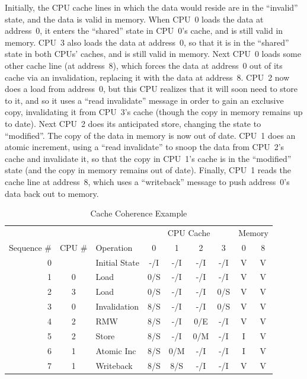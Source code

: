 Initially, the CPU cache lines in which the data would reside are
in the ``invalid'' state, and the data is valid in memory.
When CPU~0 loads the data at address~0, it enters the ``shared'' state in
CPU~0's cache, and is still valid in memory.
CPU~3 also loads the data at address~0, so that it is in the
``shared'' state in both CPUs' caches, and is still valid in memory.
Next CPU~0 loads some other cache line (at address~8),
which forces the data at address~0 out of its cache via an invalidation,
replacing it with the data at address~8.
CPU~2 now does a load from address~0, but this CPU realizes that it will
soon need to store to it, and so it uses a ``read invalidate'' message
in order to gain an exclusive copy, invalidating
it from CPU~3's cache (though the copy in memory remains up to date).
Next CPU~2 does its anticipated store, changing the state to ``modified''.
The copy of the data in memory is now out of date.
CPU~1 does an atomic increment, using a ``read invalidate'' to snoop
the data from CPU~2's cache
and invalidate it, so that the copy in CPU~1's cache is in the ``modified''
state (and the copy in memory remains out of date).
Finally, CPU~1 reads the cache line at address~8, which uses a
``writeback'' message to push address~0's data back out to memory.
\fi

\begin{table}
\small
\begin{center}
\begin{tabular}{r|c|l||c|c|c|c||c|c}
	& & & \multicolumn{4}{c||}{CPU Cache} & \multicolumn{2}{c}{Memory} \\
	\cline{4-7}
	Sequence \# & CPU \# & Operation & 0 & 1 & 2 & 3 & 0 & 8 \\
	\hline
	\hline
	0 &   & Initial State	& -/I & -/I & -/I & -/I   & V & V \\
	\hline
	1 & 0 & Load		& 0/S & -/I & -/I & -/I   & V & V \\
	\hline
	2 & 3 & Load		& 0/S & -/I & -/I & 0/S   & V & V \\
	\hline
	3 & 0 & Invalidation	& 8/S & -/I & -/I & 0/S   & V & V \\
	\hline
	4 & 2 & RMW		& 8/S & -/I & 0/E & -/I   & V & V \\
	\hline
	5 & 2 & Store		& 8/S & -/I & 0/M & -/I   & I & V \\
	\hline
	6 & 1 & Atomic Inc	& 8/S & 0/M & -/I & -/I   & I & V \\
	\hline
	7 & 1 & Writeback	& 8/S & 8/S & -/I & -/I   & V & V \\
\end{tabular}
\end{center}
\caption{Cache Coherence Example}
\label{tab:app:whymb:Cache Coherence Example}
\end{table}

